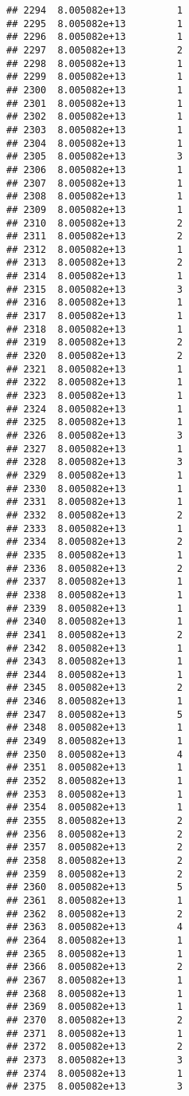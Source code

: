 \documentclass[
]{article}
\begin{document}
\begin{verbatim}
## 2294  8.005082e+13         1
## 2295  8.005082e+13         1
## 2296  8.005082e+13         1
## 2297  8.005082e+13         2
## 2298  8.005082e+13         1
## 2299  8.005082e+13         1
## 2300  8.005082e+13         1
## 2301  8.005082e+13         1
## 2302  8.005082e+13         1
## 2303  8.005082e+13         1
## 2304  8.005082e+13         1
## 2305  8.005082e+13         3
## 2306  8.005082e+13         1
## 2307  8.005082e+13         1
## 2308  8.005082e+13         1
## 2309  8.005082e+13         1
## 2310  8.005082e+13         2
## 2311  8.005082e+13         2
## 2312  8.005082e+13         1
## 2313  8.005082e+13         2
## 2314  8.005082e+13         1
## 2315  8.005082e+13         3
## 2316  8.005082e+13         1
## 2317  8.005082e+13         1
## 2318  8.005082e+13         1
## 2319  8.005082e+13         2
## 2320  8.005082e+13         2
## 2321  8.005082e+13         1
## 2322  8.005082e+13         1
## 2323  8.005082e+13         1
## 2324  8.005082e+13         1
## 2325  8.005082e+13         1
## 2326  8.005082e+13         3
## 2327  8.005082e+13         1
## 2328  8.005082e+13         3
## 2329  8.005082e+13         1
## 2330  8.005082e+13         1
## 2331  8.005082e+13         1
## 2332  8.005082e+13         2
## 2333  8.005082e+13         1
## 2334  8.005082e+13         2
## 2335  8.005082e+13         1
## 2336  8.005082e+13         2
## 2337  8.005082e+13         1
## 2338  8.005082e+13         1
## 2339  8.005082e+13         1
## 2340  8.005082e+13         1
## 2341  8.005082e+13         2
## 2342  8.005082e+13         1
## 2343  8.005082e+13         1
## 2344  8.005082e+13         1
## 2345  8.005082e+13         2
## 2346  8.005082e+13         1
## 2347  8.005082e+13         5
## 2348  8.005082e+13         1
## 2349  8.005082e+13         1
## 2350  8.005082e+13         4
## 2351  8.005082e+13         1
## 2352  8.005082e+13         1
## 2353  8.005082e+13         1
## 2354  8.005082e+13         1
## 2355  8.005082e+13         2
## 2356  8.005082e+13         2
## 2357  8.005082e+13         2
## 2358  8.005082e+13         2
## 2359  8.005082e+13         2
## 2360  8.005082e+13         5
## 2361  8.005082e+13         1
## 2362  8.005082e+13         2
## 2363  8.005082e+13         4
## 2364  8.005082e+13         1
## 2365  8.005082e+13         1
## 2366  8.005082e+13         2
## 2367  8.005082e+13         1
## 2368  8.005082e+13         1
## 2369  8.005082e+13         1
## 2370  8.005082e+13         2
## 2371  8.005082e+13         1
## 2372  8.005082e+13         2
## 2373  8.005082e+13         3
## 2374  8.005082e+13         1
## 2375  8.005082e+13         3

\end{verbatim}
\end{document}
